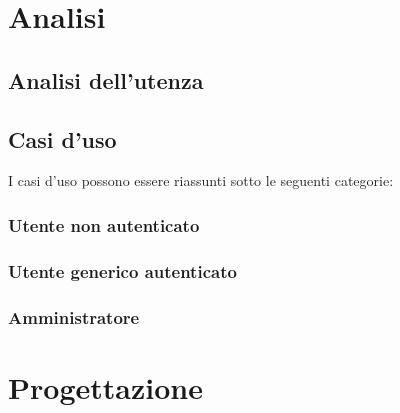 \documentclass{article}
\begin{document}
	\section{Analisi}
		\subsection{Analisi dell'utenza}
		\subsection{Casi d'uso}
			I casi d'uso possono essere riassunti sotto le seguenti categorie:
			\subsubsection{Utente non autenticato}
			\subsubsection{Utente generico autenticato}
			\subsubsection{Amministratore}
	\section{Progettazione}
\end{document}
